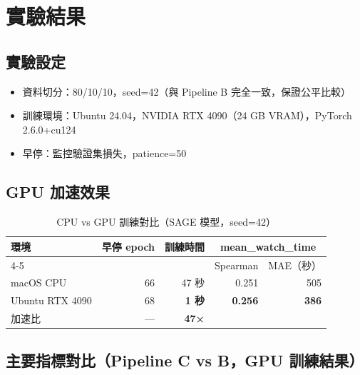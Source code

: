 \documentclass[12pt, a4paper]{article}
\begin{document}
\section{實驗結果}
\label{sec:exp}

\subsection{實驗設定}

\begin{itemize}
\item 資料切分：80/10/10，seed=42（與 Pipeline B 完全一致，保證公平比較）
\item 訓練環境：Ubuntu 24.04，NVIDIA RTX 4090（24 GB VRAM），PyTorch 2.6.0+cu124
\item 早停：監控驗證集損失，patience=50
\end{itemize}

\subsection{GPU 加速效果}

\begin{table}[H]
\centering
\caption{CPU vs GPU 訓練對比（SAGE 模型，seed=42）}
\begin{tabular}{lrrrr}
\toprule
\textbf{環境} & \textbf{早停 epoch} & \textbf{訓練時間} & \multicolumn{2}{c}{\textbf{mean\_watch\_time}} \\
\cmidrule(lr){4-5}
& & & Spearman & MAE（秒） \\
\midrule
macOS CPU & 66 & 47 秒 & 0.251 & 505 \\
Ubuntu RTX 4090 & 68 & \textbf{1 秒} & \textbf{0.256} & \textbf{386} \\
\midrule
加速比 & — & \textbf{47×} & & \\
\bottomrule
\end{tabular}
\end{table}

\subsection{主要指標對比（Pipeline C vs B，GPU 訓練結果）}
\end{document}

